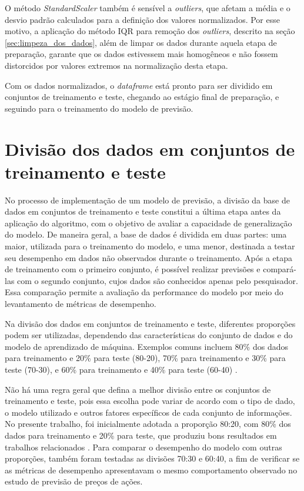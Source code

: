 O método \textit{StandardScaler} também é sensível a \textit{outliers}, que afetam a média e o desvio padrão calculados para a definição dos valores normalizados. Por esse motivo, a aplicação do método \gls{IQR} para remoção dos \textit{outliers}, descrito na seção \ref{sec:limpeza_dos_dados}, além de limpar os dados durante aquela etapa de preparação, garante que os dados estivessem mais homogêneos e não fossem distorcidos por valores extremos na normalização desta etapa.

Com os dados normalizados, o \textit{dataframe} está pronto para ser dividido em conjuntos de treinamento e teste, chegando ao estágio final de preparação, e seguindo para o treinamento do modelo de previsão. 

\section{Divisão dos dados em conjuntos de treinamento e teste}
\label{sec:divisao_dados_treino_teste}

No processo de implementação de um modelo de previsão, a divisão da base de dados em conjuntos de treinamento e teste constitui a última etapa antes da aplicação do algoritmo, com o objetivo de avaliar a capacidade de generalização do modelo. De maneira geral, a base de dados é dividida em duas partes: uma maior, utilizada para o treinamento do modelo, e uma menor, destinada a testar seu desempenho em dados não observados durante o treinamento. Após a etapa de treinamento com o primeiro conjunto, é possível realizar previsões e compará-las com o segundo conjunto, cujos dados são conhecidos apenas pelo pesquisador. Essa comparação permite a avaliação da performance do modelo por meio do levantamento de métricas de desempenho.

Na divisão dos dados em conjuntos de treinamento e teste, diferentes proporções podem ser utilizadas, dependendo das características do conjunto de dados e do modelo de aprendizado de máquina. Exemplos comuns incluem 80\% dos dados para treinamento e 20\% para teste (80-20), 70\% para treinamento e 30\% para teste (70-30), e 60\% para treinamento e 40\% para teste (60-40) \cite{supri2023asian}.

Não há uma regra geral que defina a melhor divisão entre os conjuntos de treinamento e teste, pois essa escolha pode variar de acordo com o tipo de dado, o modelo utilizado e outros fatores específicos de cada conjunto de informações. No presente trabalho, foi inicialmente adotada a proporção 80:20, com 80\% dos dados para treinamento e 20\% para teste, que produziu bons resultados em trabalhos relacionados \cite{supri2023asian}. Para comparar o desempenho do modelo com outras proporções, também foram testadas as divisões 70:30 e 60:40, a fim de verificar se as métricas de desempenho apresentavam o mesmo comportamento observado no estudo de previsão de preços de ações.

